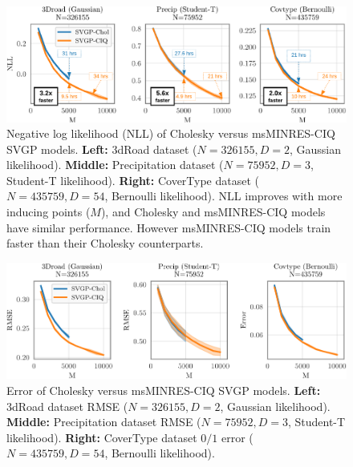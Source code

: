 \begin{figure}[t!]
  \centering
  \includegraphics[width=\linewidth]{figures/variational_nll.pdf}
  \caption[Negative log likelihood (NLL) of Cholesky versus msMINRES-CIQ SVGP models.]{
    Negative log likelihood (NLL) of Cholesky versus msMINRES-CIQ SVGP models.
    {\bf Left:} 3dRoad dataset ($N=326155, D=2$, Gaussian likelihood).
    {\bf Middle:} Precipitation dataset ($N=75952, D=3$, Student-T likelihood).
    {\bf Right:} CoverType dataset ($N=435759, D=54$, Bernoulli likelihood).
    NLL improves with more inducing points ($M$), and Cholesky and msMINRES-CIQ models have similar performance.
    However msMINRES-CIQ models train faster than their Cholesky counterparts.
  }
  \label{fig:variational_nll}
\end{figure}

\begin{figure}[t!]
  \centering
  \includegraphics[width=\linewidth]{figures/variational_error.pdf}
  \caption[Error of Cholesky versus msMINRES-CIQ SVGP models.]{
    Error of Cholesky versus msMINRES-CIQ SVGP models.
    {\bf Left:} 3dRoad dataset RMSE ($N=326155, D=2$, Gaussian likelihood).
    {\bf Middle:} Precipitation dataset RMSE ($N=75952, D=3$, Student-T likelihood).
    {\bf Right:} CoverType dataset $0/1$ error ($N=435759, D=54$, Bernoulli likelihood).
  }
  \label{fig:variational_error}
\end{figure}

